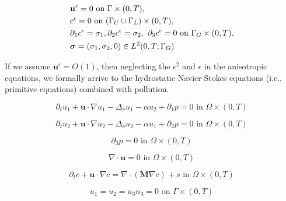 \documentclass[11pt]{article}
\begin{document}
    \begin{equation} \label{ANSC8}
      \begin{split}
        & \mathbf{u}^\epsilon = 0 \text{ on } \Gamma \times (0,T), \\
        &c^\epsilon = 0 \text{ on } ( \Gamma_U \cup \Gamma_L) \times (0,T), \\
        & \partial_1 c^\epsilon = \sigma_1, \partial_2 c^\epsilon = \sigma_2,\ \partial_3 c^\epsilon= 0 \text{ on } \Gamma_G \times (0,T), \\
        & \boldsymbol{\sigma} = (\sigma_1, \sigma_2, 0) \in L^2(0,T; \Gamma_G)\\
      \end{split} \raisetag{40pt}
    \end{equation}

If we assume $\mathbf{u}^\epsilon = O(1)$, then neglecting the $\epsilon^2$ and $\epsilon$ in the anisotropic equations, we formally arrive to the hydrostatic Navier-Stokes equations (i.e., primitive equations) combined with pollution.

    \begin{equation} \label{HNSC1}    
    \partial_t u_1 + \mathbf{u} \cdot \nabla u_1 - \Delta_\nu u_1 -\alpha u_2 + \partial_1 p = 0 \text{ in } \Omega \times (0,T)
    \end{equation}
    
    \begin{equation} \label{HNSC2}   
    \partial_t u_2 + \mathbf{u} \cdot \nabla u_2 - \Delta_\nu u_2 -\alpha u_1 + \partial_2 p = 0 \text{ in } \Omega \times (0,T)
    \end{equation}
    
    \begin{equation} \label{HNSC3}   
    \partial_3 p = 0 \text{ in } \Omega \times (0,T)
    \end{equation}
    
    \begin{equation} \label{HNSC4}   
    \nabla \cdot \mathbf{u} = 0 \text{ in } \Omega \times (0,T)
    \end{equation}
    
    \begin{equation} \label{HNSC5}   
    \partial_t c + \mathbf{u} \cdot \nabla c = \nabla \cdot (\mathbf{M} \nabla c) + s \text{ in } \Omega \times (0,T)
    \end{equation}
    
    \begin{equation} \label{HNSC6}   
    u_1 = u_2 = u_3 n_3 = 0 \text{ on } \Gamma \times (0,T)
    \end{equation}
    
\end{document}
